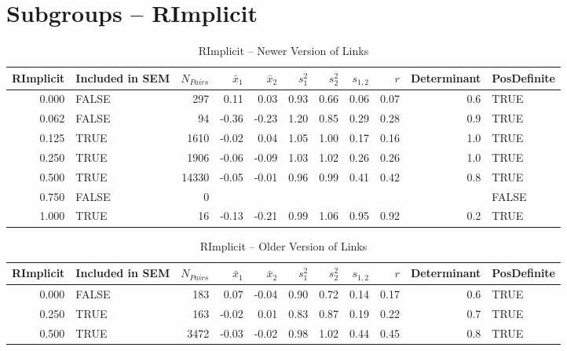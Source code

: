 \documentclass{article}\usepackage[]{graphicx}\usepackage[]{color}
\begin{document}
\section{Subgroups --  RImplicit }%
\begin{table}[ht]
\centering
\begin{tabular}{rlrrrrrrrrl}
  \hline
RImplicit & Included in SEM & $N_{Pairs}$ & $\bar{x}_1$ & $\bar{x}_2$ & $s_1^2$ & $s_2^2$ & $s_{1,2}$ & $r$ & Determinant & PosDefinite \\ 
  \hline
0.000 & FALSE & 297 & 0.11 & 0.03 & 0.93 & 0.66 & 0.06 & 0.07 & 0.6 & TRUE \\ 
  0.062 & FALSE & 94 & -0.36 & -0.23 & 1.20 & 0.85 & 0.29 & 0.28 & 0.9 & TRUE \\ 
  0.125 & TRUE & 1610 & -0.02 & 0.04 & 1.05 & 1.00 & 0.17 & 0.16 & 1.0 & TRUE \\ 
  0.250 & TRUE & 1906 & -0.06 & -0.09 & 1.03 & 1.02 & 0.26 & 0.26 & 1.0 & TRUE \\ 
  0.500 & TRUE & 14330 & -0.05 & -0.01 & 0.96 & 0.99 & 0.41 & 0.42 & 0.8 & TRUE \\ 
  0.750 & FALSE & 0 &  &  &  &  &  &  &  & FALSE \\ 
  1.000 & TRUE & 16 & -0.13 & -0.21 & 0.99 & 1.06 & 0.95 & 0.92 & 0.2 & TRUE \\ 
   \hline
\end{tabular}
\caption{RImplicit -- Newer Version of Links} 
\end{table}
\begin{table}[ht]
\centering
\begin{tabular}{rlrrrrrrrrl}
  \hline
RImplicit & Included in SEM & $N_{Pairs}$ & $\bar{x}_1$ & $\bar{x}_2$ & $s_1^2$ & $s_2^2$ & $s_{1,2}$ & $r$ & Determinant & PosDefinite \\ 
  \hline
0.000 & FALSE & 183 & 0.07 & -0.04 & 0.90 & 0.72 & 0.14 & 0.17 & 0.6 & TRUE \\ 
  0.250 & TRUE & 163 & -0.02 & 0.01 & 0.83 & 0.87 & 0.19 & 0.22 & 0.7 & TRUE \\ 
  0.500 & TRUE & 3472 & -0.03 & -0.02 & 0.98 & 1.02 & 0.44 & 0.45 & 0.8 & TRUE \\ 
   \hline
\end{tabular}
\caption{RImplicit -- Older Version of Links} 
\end{table}
\end{document}
